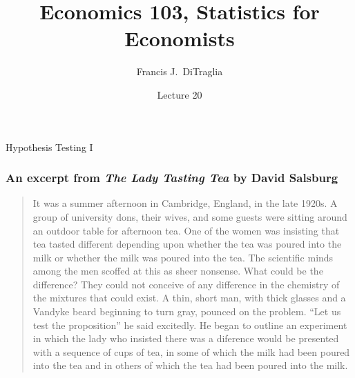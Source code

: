 \documentclass[handout]{beamer}
\title[Econ 103]{Economics 103, Statistics for Economists}
\author[F. DiTraglia]{Francis J.\ DiTraglia}
\institute{University of Pennsylvania}
\date{Lecture 20}
\begin{document}
 





\begin{frame}[plain]
	\titlepage 
	

\end{frame} 


\begin{frame}
\begin{center}
\Huge Hypothesis Testing I
\end{center}
\end{frame}

\begin{frame}
\frametitle{An excerpt from \emph{The Lady Tasting Tea} by David Salsburg}
\footnotesize
\begin{quote}
It was a summer afternoon in Cambridge, England, in the late 1920s. A group of university dons, their wives, and some guests were sitting around an outdoor table for afternoon tea. One of the women was insisting that tea tasted different depending upon whether the tea was poured into the milk or whether the milk was poured into the tea. The scientific minds among the men scoffed at this as sheer nonsense. What could be the difference? They could not conceive of any difference in the chemistry of the mixtures that could exist. A thin, short man, with thick glasses and a Vandyke beard beginning to turn gray, pounced on the problem. ``Let us test the proposition'' he said excitedly. He began to outline an experiment in which the lady who insisted there was a diference would be presented with a sequence of cups of tea, in some of which the milk had been poured into the tea and in others of which the tea had been poured into the milk.
\end{quote}
\end{frame}




\end{document}
